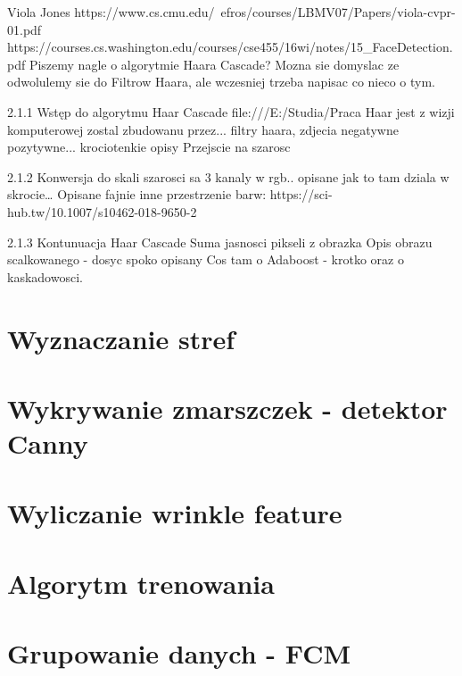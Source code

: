 Viola Jones
https://www.cs.cmu.edu/~efros/courses/LBMV07/Papers/viola-cvpr-01.pdf
https://courses.cs.washington.edu/courses/cse455/16wi/notes/15_FaceDetection.pdf
Piszemy nagle o algorytmie Haara Cascade?
Mozna sie domyslac ze odwolulemy sie do Filtrow Haara, ale wczesniej trzeba napisac co nieco o tym.

2.1.1 Wstęp do algorytmu Haar Cascade
file:///E:/Studia/Praca%
Haar jest z wizji komputerowej zostal zbudowanu przez... filtry haara, zdjecia negatywne pozytywne...
krociotenkie opisy
Przejscie na szarosc %

2.1.2 Konwersja do skali szarosci
sa 3 kanaly w rgb.. opisane jak to tam dziala w skrocie…
Opisane fajnie inne przestrzenie barw:
https://sci-hub.tw/10.1007/s10462-018-9650-2


2.1.3 Kontunuacja Haar Cascade %
Suma jasnosci pikseli z obrazka
Opis obrazu scalkowanego - dosyc spoko opisany
Cos tam o Adaboost - krotko oraz o kaskadowosci.

\section{Wyznaczanie stref}\label{sec:wyznaczanieStref}

\section{Wykrywanie zmarszczek - detektor Canny}\label{sec:wykrywanieZmarszczek}

\section{Wyliczanie wrinkle feature}\label{sec:wyliczanieWrinkleFeature}

\section{Algorytm trenowania}\label{sec:algorytmTrenowania}

\section{Grupowanie danych - FCM}\label{sec:grupowanieDanych}

